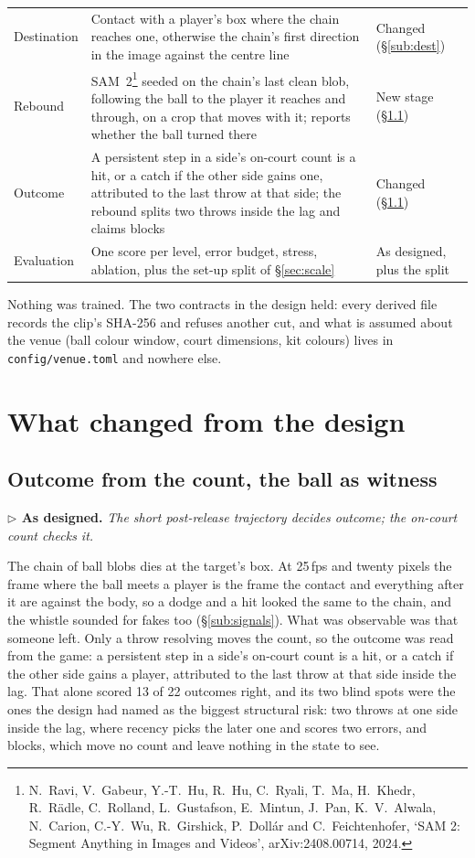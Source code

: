 \documentclass[10pt,a4paper]{article}
\newcommand{\design}[1]{%
  \par\smallskip\noindent
  {\color{accent!88!black}\small\textbf{$\triangleright$ As designed.} \textit{#1}}\par\smallskip}
\begin{document}
{\begin{xltabular}{\textwidth}{L{26mm} X L{40mm}}
Destination & Contact with a player's box where the chain reaches one, otherwise the chain's first direction in the image against the centre line & Changed (\S\ref{sub:dest})\\
Rebound & SAM~2\footnote{N.\ Ravi, V.\ Gabeur, Y.-T.\ Hu, R.\ Hu, C.\ Ryali, T.\ Ma, H.\ Khedr, R.\ R\"adle, C.\ Rolland, L.\ Gustafson, E.\ Mintun, J.\ Pan, K.\ V.\ Alwala, N.\ Carion, C.-Y.\ Wu, R.\ Girshick, P.\ Doll\'ar and C.\ Feichtenhofer, `SAM 2: Segment Anything in Images and Videos', arXiv:2408.00714, 2024.} seeded on the chain's last clean blob, following the ball to the player it reaches and through, on a crop that moves with it; reports whether the ball turned there & New stage (\S\ref{sub:outcome})\\
Outcome & A persistent step in a side's on-court count is a hit, or a catch if the other side gains one, attributed to the last throw at that side; the rebound splits two throws inside the lag and claims blocks & Changed (\S\ref{sub:outcome})\\
Evaluation & One score per level, error budget, stress, ablation, plus the set-up split of \S\ref{sec:scale} & As designed, plus the split\\
\bottomrule
\end{xltabular}}

Nothing was trained. The two contracts in the design held: every derived file records
the clip's SHA-256 and refuses another cut, and what is assumed about the venue (ball
colour window, court dimensions, kit colours) lives in \texttt{config/venue.toml} and
nowhere else.

\section{What changed from the design}
\label{sec:changed}

\subsection{Outcome from the count, the ball as witness}
\label{sub:outcome}

\design{The short post-release trajectory decides outcome; the on-court count checks it.}

The chain of ball blobs dies at the target's box. At 25\,fps and twenty pixels the frame
where the ball meets a player is the frame the contact and everything after it are against
the body, so a dodge and a hit looked the same to the chain, and the whistle sounded for
fakes too (\S\ref{sub:signals}). What was observable was that someone left. Only a throw
resolving moves the count, so the outcome was read from the game: a persistent step in a
side's on-court count is a hit, or a catch if the other side gains a player, attributed to
the last throw at that side inside the lag. That alone scored 13 of 22 outcomes right, and
its two blind spots were the ones the design had named as the biggest structural risk: two
throws at one side inside the lag, where recency picks the later one and scores two errors,
and blocks, which move no count and leave nothing in the state to see.
\end{document}
